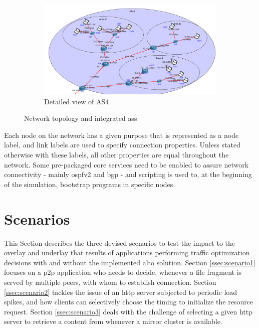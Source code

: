     \begin{figure} \ContinuedFloat
    \begin{subfigure}[t]{\textwidth}
    \centering
    \includegraphics[scale=0.5]{img/topology-experiments-AS4.png}
    \caption{Detailed view of AS4}    
    \label{fig:exp-as4}
    \end{subfigure}

    \caption{Network topology and integrated \glspl{as}}
    \label{fig:exp-topology}
    \end{figure}


    Each node on the network has a given purpose that is represented as a node label, and link labels are used to specify connection properties.
    Unless stated otherwise with these labels, all other properties are equal throughout the network.
    Some pre-packaged \gls{core} services need to be enabled to assure network connectivity - mainly \gls{ospfv2} and \gls{bgp} - and scripting is used to, at the beginning of the simulation, bootstrap programs in specific nodes.

\section{Scenarios}

\label{sec:experiments-scenarios}

    This Section describes the three devised scenarios to test the impact to the overlay and underlay that results of applications performing traffic optimization decisions with and without the implemented \gls{alto} solution.
    Section \ref{ssec:scenario1} focuses on a \gls{p2p} application who needs to decide, whenever a file fragment is served by multiple peers, with whom to establish connection.
    Section \ref{ssec:scenario2} tackles the issue of an \gls{http} server subjected to periodic load spikes, and how clients can selectively choose the timing to initialize the resource request.
    Section \ref{ssec:scenario3} deals with the challenge of selecting a given \gls{http} server to retrieve a content from whenever a mirror cluster is available.

